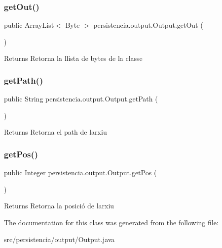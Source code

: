 \subsubsection{\texorpdfstring{get\+Out()}{getOut()}}
{\footnotesize\ttfamily public Array\+List$<$ Byte $>$ persistencia.\+output.\+Output.\+get\+Out (\begin{DoxyParamCaption}{ }\end{DoxyParamCaption})\hspace{0.3cm}{\ttfamily [inline]}}

\begin{DoxyReturn}{Returns}
Retorna la llista de bytes de la classe 
\end{DoxyReturn}
\mbox{\label{classpersistencia_1_1output_1_1Output_ae33fc52334f791b6d4d7aebf2931df8d}} 
\subsubsection{\texorpdfstring{get\+Path()}{getPath()}}
{\footnotesize\ttfamily public String persistencia.\+output.\+Output.\+get\+Path (\begin{DoxyParamCaption}{ }\end{DoxyParamCaption})\hspace{0.3cm}{\ttfamily [inline]}}

\begin{DoxyReturn}{Returns}
Retorna el path de l\textquotesingle{}arxiu 
\end{DoxyReturn}
\mbox{\label{classpersistencia_1_1output_1_1Output_a01f862217e01efb59bc2eff3fe54006f}} 
\subsubsection{\texorpdfstring{get\+Pos()}{getPos()}}
{\footnotesize\ttfamily public Integer persistencia.\+output.\+Output.\+get\+Pos (\begin{DoxyParamCaption}{ }\end{DoxyParamCaption})\hspace{0.3cm}{\ttfamily [inline]}}

\begin{DoxyReturn}{Returns}
Retorna la posició de l\textquotesingle{}arxiu 
\end{DoxyReturn}


The documentation for this class was generated from the following file\+:\begin{DoxyCompactItemize}
\item 
src/persistencia/output/Output.\+java\end{DoxyCompactItemize}
